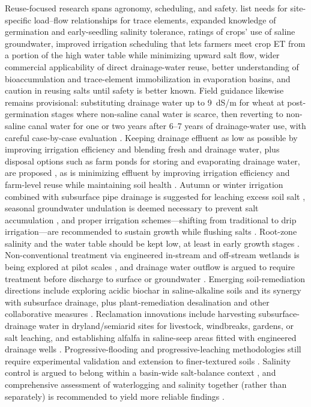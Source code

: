 \documentclass[11pt]{article}
\begin{document}
Reuse-focused research spans agronomy, scheduling, and safety. \textcite{WESTCOT1988} list needs for site-specific load--flow relationships for trace elements, expanded knowledge of germination and early-seedling salinity tolerance, ratings of crops' use of saline groundwater, improved irrigation scheduling that lets farmers meet crop ET from a portion of the high water table while minimizing upward salt flow, wider commercial applicability of direct drainage-water reuse, better understanding of bioaccumulation and trace-element immobilization in evaporation basins, and caution in reusing salts until safety is better known. Field guidance likewise remains provisional: substituting drainage water up to 9~dS/m for wheat at post-germination stages where non-saline canal water is scarce, then reverting to non-saline canal water for one or two years after 6--7 years of drainage-water use, with careful case-by-case evaluation \parencite{Sharma1998}. Keeping drainage effluent as low as possible by improving irrigation efficiency and blending fresh and drainage water, plus disposal options such as farm ponds for storing and evaporating drainage water, are proposed \parencite{Datta2002}, as is minimizing effluent by improving irrigation efficiency and farm-level reuse while maintaining soil health \parencite{Qureshi2008}. Autumn or winter irrigation combined with subsurface pipe drainage is suggested for leaching excess soil salt \parencite{Dou2022}, seasonal groundwater undulation is deemed necessary to prevent salt accumulation \parencite{Mirlas2021}, and proper irrigation schemes---shifting from traditional to drip irrigation---are recommended to sustain growth while flushing salts \parencite{Mirlas2021}. Root-zone salinity and the water table should be kept low, at least in early growth stages \parencite{Singh2019}. Non-conventional treatment via engineered in-stream and off-stream wetlands is being explored at pilot scales \parencite{AbdelDayem2007}, and drainage water outflow is argued to require treatment before discharge to surface or groundwater \parencite{Filipovic2015}. Emerging soil-remediation directions include exploring acidic biochar in saline-alkaline soils and its synergy with subsurface drainage, plus plant-remediation desalination and other collaborative measures \parencite{Liu2025f}. Reclamation innovations include harvesting subsurface-drainage water in dryland/semiarid sites for livestock, windbreaks, gardens, or salt leaching, and establishing alfalfa in saline-seep areas fitted with engineered drainage wells \parencite{Steppuhn2017}. Progressive-flooding and progressive-leaching methodologies still require experimental validation and extension to finer-textured soils \parencite{Youngs2000}. Salinity control is argued to belong within a basin-wide salt-balance context \parencite{Qureshi2008}, and comprehensive assessment of waterlogging and salinity together (rather than separately) is recommended to yield more reliable findings \parencite{Valipour2014}.
\end{document}
